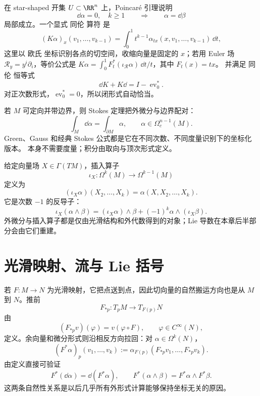在 star-shaped 开集 $U\subset\RR^n$ 上，Poincar\'e 引理说明
\[
\dd\alpha=0,
\quad k\ge1
\qquad\Longrightarrow\qquad
\alpha=\dd\beta
\]
局部成立。一个显式 同伦 算符 是
\begin{equation}
(K\alpha)_x(v_1,\ldots,v_{k-1})
=\int_0^1 t^{k-1}
\alpha_{tx}(x,v_1,\ldots,v_{k-1})\,\dd t,
\label{eq:poincare-homotopy-operator}
\end{equation}
这里以 欧氏 坐标识别各点的切空间，收缩向量是固定的 $x$；若用 Euler 场 $\mathcal R_y=y^i\partial_i$，等价公式是 $K\alpha=\int_0^1F_t^*(\iota_{\mathcal R}\alpha)\,\dd t/t$，其中 $F_t(x)=tx$。
并满足 同伦 恒等式
\begin{equation}
\dd K+K\dd=I-\operatorname{ev}_0^*.
\label{eq:poincare-homotopy-identity}
\end{equation}
对正次数形式，$\operatorname{ev}_0^*=0$，所以闭形式自动恰当。

若 $M$ 可定向并带边界，则 Stokes 定理把外微分与边界配对：
\begin{equation}
\int_M\dd\alpha=\int_{\partial M}\alpha,
\qquad
\alpha\in\Omega_c^{n-1}(M).
\label{eq:stokes-general}
\end{equation}
Green、Gauss 和经典 Stokes 公式都是它在不同次数、不同度量识别下的坐标化版本。 本身不需要度量；积分由取向与顶次形式定义。

给定向量场 $X\in\Gamma(TM)$，插入算子
\begin{equation*}\iota_{X}:\Omega^k(M)\longrightarrow\Omega^{k-1}(M)
\end{equation*}
定义为
\[
(\iota_{X}\alpha)(X_2,\ldots,X_k)
=\alpha(X,X_2,\ldots,X_k).
\]
它是次数 $-1$ 的反导子：
\[
\iota_{X}(\alpha\wedge\beta)
=(\iota_{X}\alpha)\wedge\beta
+(-1)^k\alpha\wedge(\iota_{X}\beta).
\]
外微分与插入算子都是仅由光滑结构和外代数得到的对象；Lie 导数在本章后半部分会由它们重建。

\section{光滑映射、流与 Lie 括号}
若 $F:M\to N$ 为光滑映射，它把点送到点，因此切向量的自然搬运方向也是从 $M$ 到 $N$。推前
\begin{equation*}F_{*p}:T_pM\to T_{F(p)}N
\end{equation*}
由
\[
(F_{*p}v)(\varphi)=v(\varphi\circ F),
\qquad \varphi\in C^\infty(N),
\]
定义。余向量和微分形式则沿相反方向拉回：对 $\alpha\in\Omega^k(N)$，
\begin{equation*}(F^*\alpha)_p(v_1,\ldots,v_k)
:=\alpha_{F(p)}(F_{*p}v_1,\ldots,F_{*p}v_k).
\end{equation*}
由定义直接可验证
\begin{equation*}F^*(\dd\alpha)=\dd(F^*\alpha),
\qquad
F^*(\alpha\wedge\beta)=F^*\alpha\wedge F^*\beta.
\end{equation*}
这两条自然性关系是以后几乎所有外形式计算能够保持坐标无关的原因。


